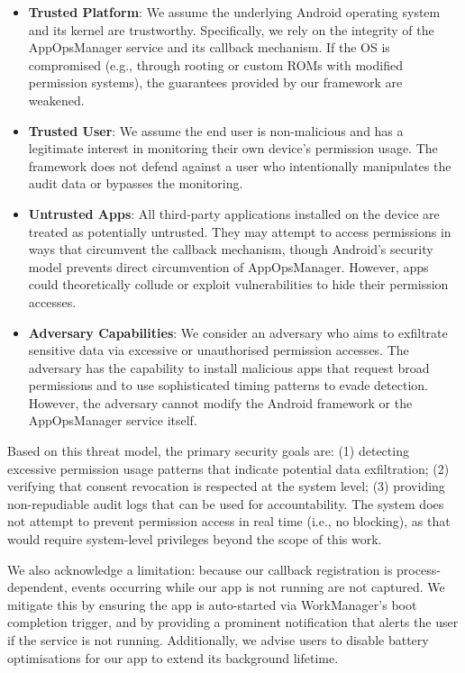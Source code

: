 \begin{itemize}
\item \textbf{Trusted Platform}: We assume the underlying Android operating system and its kernel are trustworthy. Specifically, we rely on the integrity of the AppOpsManager service and its callback mechanism. If the OS is compromised (e.g., through rooting or custom ROMs with modified permission systems), the guarantees provided by our framework are weakened.
\item \textbf{Trusted User}: We assume the end user is non-malicious and has a legitimate interest in monitoring their own device's permission usage. The framework does not defend against a user who intentionally manipulates the audit data or bypasses the monitoring.
\item \textbf{Untrusted Apps}: All third-party applications installed on the device are treated as potentially untrusted. They may attempt to access permissions in ways that circumvent the callback mechanism, though Android's security model prevents direct circumvention of AppOpsManager. However, apps could theoretically collude or exploit vulnerabilities to hide their permission accesses.
\item \textbf{Adversary Capabilities}: We consider an adversary who aims to exfiltrate sensitive data via excessive or unauthorised permission accesses. The adversary has the capability to install malicious apps that request broad permissions and to use sophisticated timing patterns to evade detection. However, the adversary cannot modify the Android framework or the AppOpsManager service itself.
\end{itemize}

Based on this threat model, the primary security goals are: (1) detecting excessive permission usage patterns that indicate potential data exfiltration; (2) verifying that consent revocation is respected at the system level; (3) providing non-repudiable audit logs that can be used for accountability. The system does not attempt to prevent permission access in real time (i.e., no blocking), as that would require system-level privileges beyond the scope of this work.

We also acknowledge a limitation: because our callback registration is process-dependent, events occurring while our app is not running are not captured. We mitigate this by ensuring the app is auto-started via WorkManager's boot completion trigger, and by providing a prominent notification that alerts the user if the service is not running. Additionally, we advise users to disable battery optimisations for our app to extend its background lifetime.


